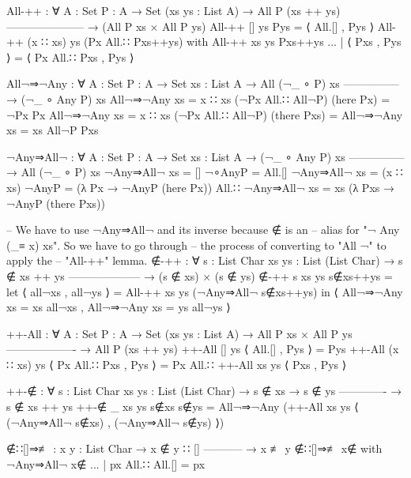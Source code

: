 \begin{code}
  All-++ : ∀ {A : Set} {P : A → Set} (xs ys : List A)
    → All P (xs ++ ys)
      ---------------------
    → (All P xs × All P ys)
  All-++ [] ys Pys = ⟨ All.[] , Pys ⟩
  All-++ (x ∷ xs) ys (Px All.∷ Pxs++ys) with All-++ xs ys Pxs++ys
  ... | ⟨ Pxs , Pys ⟩ = ⟨ Px All.∷ Pxs , Pys ⟩

  All¬⇒¬Any : ∀ {A : Set} {P : A → Set} {xs : List A}
    → All (¬_ ∘ P) xs
      ---------------
    → (¬_ ∘ Any P) xs
  All¬⇒¬Any {xs = x ∷ xs} (¬Px All.∷ All¬P) (here Px) = ¬Px Px
  All¬⇒¬Any {xs = x ∷ xs} (¬Px All.∷ All¬P) (there Pxs) =
    All¬⇒¬Any {xs = xs} All¬P Pxs

  ¬Any⇒All¬ : ∀ {A : Set} {P : A → Set} {xs : List A}
    → (¬_ ∘ Any P) xs
      ---------------
    → All (¬_ ∘ P) xs
  ¬Any⇒All¬ {xs = []} ¬∘AnyP = All.[]
  ¬Any⇒All¬ {xs = (x ∷ xs)} ¬AnyP =
    (λ Px → ¬AnyP (here Px))
      All.∷ ¬Any⇒All¬ {xs = xs} (λ Pxs → ¬AnyP (there Pxs))

  -- We have to use ¬Any⇒All¬ and its inverse because ∉ is an
  -- alias for "¬ Any (_≡ x) xs".  So we have to go through
  -- the process of converting to "All ¬" to apply the
  -- "All-++" lemma.
  ∉-++ : ∀ {s : List Char} {xs ys : List (List Char)}
    → s ∉ xs ++ ys
      --------------------
    → (s ∉ xs) × (s ∉ ys)
  ∉-++ {s} {xs} {ys} s∉xs++ys =
    let ⟨ all¬xs , all¬ys ⟩ = All-++ xs ys (¬Any⇒All¬ s∉xs++ys) in
      ⟨ All¬⇒¬Any {xs = xs} all¬xs
      , All¬⇒¬Any {xs = ys} all¬ys ⟩

  ++-All : ∀ {A : Set} {P : A → Set} (xs ys : List A)
    → All P xs × All P ys
      -------------------
    → All P (xs ++ ys)
  ++-All [] ys ⟨ All.[] , Pys ⟩ = Pys
  ++-All (x ∷ xs) ys ⟨ Px All.∷ Pxs , Pys ⟩ =
    Px All.∷ ++-All xs ys ⟨ Pxs , Pys ⟩

  ++-∉ : ∀ {s : List Char} {xs ys : List (List Char)}
    → s ∉ xs
    → s ∉ ys
      -------------
    → s ∉ xs ++ ys
  ++-∉ {_} {xs} {ys} s∉xs s∉ys = All¬⇒¬Any
    (++-All xs ys ⟨ (¬Any⇒All¬ s∉xs) , (¬Any⇒All¬ s∉ys) ⟩)

  ∉∷[]⇒≢ : {x y : List Char}
    → x ∉ y ∷ []
      -----------
    → x ≢ y
  ∉∷[]⇒≢ x∉ with ¬Any⇒All¬ x∉
  ... | px All.∷ All.[] = px
\end{code}

